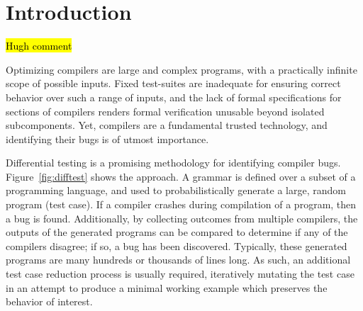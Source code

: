 \section{Introduction}\label{sec:intro}

\hl{Hugh comment}

\noindent
Optimizing compilers are large and complex programs, with a practically infinite scope of possible inputs. Fixed test-suites are inadequate for ensuring correct behavior over such a range of inputs, and the lack of formal specifications for sections of compilers renders formal verification unusable beyond isolated subcomponents. Yet, compilers are a fundamental trusted technology, and identifying their bugs is of utmost importance. %


Differential testing is a promising methodology for identifying compiler bugs. Figure~\ref{fig:difftest} shows the approach. A grammar is defined over a subset of a programming language, and used to probabilistically generate a large, random program (test case).  If a compiler crashes during compilation of a program, then a bug is found. Additionally, by collecting outcomes from multiple compilers, the outputs of the generated programs can be compared to determine if any of the compilers disagree; if so, a bug has been discovered. Typically, these generated programs are many hundreds or thousands of lines long. As such, an additional test case reduction process is usually required, iteratively mutating the test case in an attempt to produce a minimal working example which preserves the behavior of interest.

